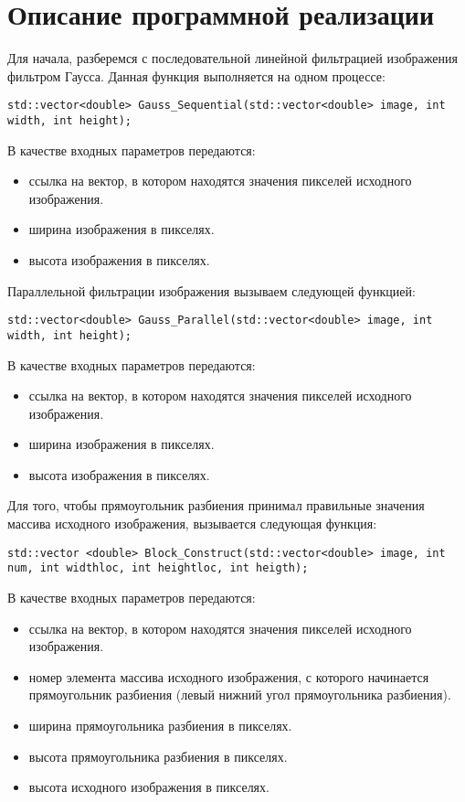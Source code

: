 \documentclass{report}
\begin{document}
\section*{Описание программной реализации}
Для начала, разберемся с последовательной линейной фильтрацией изображения фильтром Гаусса. Данная функция выполняется на одном процессе:
\begin{lstlisting}
std::vector<double> Gauss_Sequential(std::vector<double> image, int width, int height);
\end{lstlisting}
\par В качестве входных параметров передаются:
\begin{itemize}
\item ссылка на вектор, в котором находятся значения пикселей исходного изображения.
\item ширина изображения в пикселях.
\item высота изображения в пикселях.
\end{itemize}
\par Параллельной фильтрации изображения вызываем следующей функцией:
\begin{lstlisting}
std::vector<double> Gauss_Parallel(std::vector<double> image, int width, int height);
\end{lstlisting}
\par В качестве входных параметров передаются:
\begin{itemize}
\item ссылка на вектор, в котором находятся значения пикселей исходного изображения.
\item ширина изображения в пикселях.
\item высота изображения в пикселях.
\end{itemize}
\par Для того, чтобы прямоугольник разбиения принимал правильные значения массива исходного изображения, вызывается следующая функция:
\begin{lstlisting}
std::vector <double> Block_Construct(std::vector<double> image, int num, int widthloc, int heightloc, int heigth);
\end{lstlisting}
\par В качестве входных параметров передаются:
\begin{itemize}
\item ссылка на вектор, в котором находятся значения пикселей исходного изображения.
\item номер элемента массива исходного изображения, с которого начинается прямоугольник разбиения (левый нижний угол прямоугольника разбиения).
\item ширина прямоугольника разбиения в пикселях.
\item высота прямоугольника разбиения в пикселях.
\item высота исходного изображения в пикселях.
\end{itemize}
\end{document}
